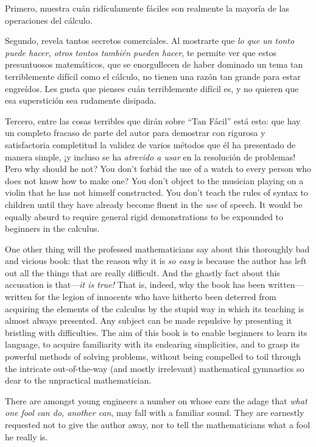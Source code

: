 \documentclass[12pt]{book}[2005/09/16]
\newcommand{\DPPageSep}[2]{\Pagelabel{#2}}
\newcommand{\Pagelabel}[1]
  {\phantomsection\label{#1}}
\begin{document}
Primero, muestra cuán ridículamente fáciles son realmente la mayoría de las
operaciones del cálculo.

Segundo, revela tantos secretos comerciales. Al
mostrarte que \emph{lo que un tonto puede hacer, otros tontos
también pueden hacer}, te permite ver que estos presuntuosos matemáticos, que se enorgullecen de haber dominado un
tema tan terriblemente difícil como el cálculo, no tienen
una razón tan grande para estar engreídos. Les gusta que pienses
cuán terriblemente difícil es, y no quieren que esa
superstición sea rudamente disipada.

Tercero, entre las cosas terribles que dirán
sobre ``Tan Fácil'' está esto: que hay un completo fracaso
de parte del autor para demostrar con rigurosa
\DPPageSep{262.png}{250}%
y satisfactoria completitud la validez de varios
métodos que él ha presentado de manera simple,
¡y incluso se ha \emph{atrevido a usar} en la resolución de problemas! Pero
why should he not? You don't forbid the use of
a watch to every person who does not know how to
make one? You don't object to the musician playing
on a violin that he has not himself constructed. You
don't teach the rules of syntax to children until they
have already become fluent in the \emph{use} of speech. It
would be equally absurd to require general rigid
demonstrations to be expounded to beginners in the
calculus.

One other thing will the professed mathematicians
say about this thoroughly bad and vicious book: that
the reason why it is \emph{so easy} is because the author has
left out all the things that are really difficult. And
the ghastly fact about this accusation is that---\emph{it
is true!} That is, indeed, why the book has been
written---written for the legion of innocents who have
hitherto been deterred from acquiring the elements of
the calculus by the stupid way in which its teaching
is almost always presented. Any subject can be made
repulsive by presenting it bristling with difficulties.
The aim of this book is to enable beginners to learn
its language, to acquire familiarity with its endearing
simplicities, and to grasp its powerful methods of
solving problems, without being compelled to toil
through the intricate out-of-the-way (and mostly
irrelevant) mathematical gymnastics so dear to the
unpractical mathematician.
\DPPageSep{263.png}{251}%

There are amongst young engineers a number on
whose ears the adage that \emph{what one fool can do,
another can}, may fall with a familiar sound. They
are earnestly requested not to give the author
away, nor to tell the mathematicians what a fool
he really is.
\DPPageSep{264.png}{252}%
\end{document}
